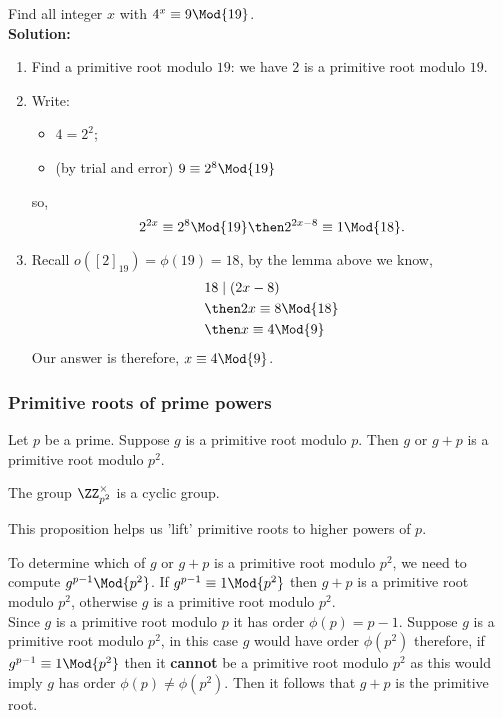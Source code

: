 \documentclass[12pt, a4paper]{article}
\begin{document}
\begin{example}
    Find all integer \(x\) with \(4^x \equiv 9 \Mod{19}\). \\
    \textbf{Solution:}
    \begin{enumerate}
        \item Find a primitive root modulo \(19\): we have \(2\) is a primitive root modulo \(19\).
        \item Write:
        \begin{itemize}
            \item \(4=2^2\);
            \item (by trial and error) \(9 \equiv 2^8 \Mod{19}\)
        \end{itemize}
        so, 
        \[2^{2x} \equiv 2^8 \Mod{19} \then 2^{2x-8} \equiv 1 \Mod{18}.\]
        \item Recall \(o([2]_{19}) = \phi(19)= 18\), by the lemma above we know, 
        \[\begin{aligned}
            &18 \mid (2x-8) \\
            &\then 2x \equiv 8 \Mod{18} \\
            &\then x \equiv 4 \Mod{9}
        \end{aligned}\]
        Our answer is therefore, \(x\equiv 4 \Mod{9}\).
    \end{enumerate}
\end{example}

\subsubsection{Primitive roots of prime powers}

\begin{mdprop}
    Let \(p\) be a prime. Suppose \(g\) is a primitive root modulo \(p\). Then \(g\) or \(g+p\) is a primitive root modulo \(p^2\).
\end{mdprop}

\begin{mdremark}
    The group \(\ZZ_{p^2}^{\times}\) is a cyclic group.
\end{mdremark}

\begin{mdnote}
    This proposition helps us 'lift' primitive roots to higher powers of \(p\).
\end{mdnote}

\begin{mdnote}
    To determine which of \(g\) or \(g+p\) is a primitive root modulo \(p^2\), we need to compute \(g^{p-1} \Mod{p^2}\). If \(g^{p-1} \equiv 1 \Mod{p^2}\) then \(g+p\) is a primitive root modulo \(p^2\), otherwise \(g\) is a primitive root modulo \(p^2\).\\
    \noindent Since \(g\) is a primitive root modulo \(p\) it has order \(\phi(p) = p-1\). Suppose \(g\) is a primitive root modulo \(p^2\), in this case \(g\) would have order \(\phi(p^2)\) therefore, if \(g^{p-1} \equiv 1 \Mod{p^2}\) then it \textbf{cannot} be a primitive root modulo \(p^2\) as this would imply \(g\) has order \(\phi(p) \neq \phi(p^2)\). Then it follows that \(g+p\) is the primitive root.
\end{mdnote}
\end{document}
